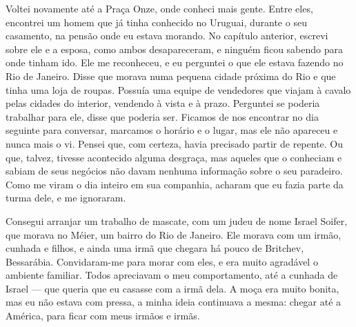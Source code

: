 
Voltei novamente até a Praça Onze, onde conheci mais gente. Entre
eles, encontrei um homem que já tinha conhecido no Uruguai, durante o seu
casamento, na pensão onde eu estava morando. No capítulo anterior, 
escrevi sobre ele e a esposa, como ambos desapareceram, e ninguém
ficou sabendo para onde tinham ido. Ele me reconheceu, e eu perguntei o
que ele estava fazendo no Rio de Janeiro. Disse que morava numa
pequena cidade próxima do Rio e que tinha uma loja de roupas. Possuía uma 
equipe de vendedores que viajam à cavalo pelas cidades do
interior, vendendo à vista e à prazo. Perguntei se poderia trabalhar para
ele, disse que poderia ser. Ficamos de nos encontrar no dia seguinte
para conversar, marcamos o horário e o lugar, mas ele não apareceu e
nunca mais o vi. Pensei que, com certeza, havia precisado partir de
repente. Ou que, talvez, tivesse acontecido alguma desgraça, mas
aqueles que o conheciam e sabiam de seus negócios não davam nenhuma
informação sobre o seu paradeiro. Como me viram o dia inteiro em sua
companhia, acharam que eu fazia parte da turma dele, e me ignoraram.


Consegui arranjar um trabalho de mascate, com um judeu de nome Israel
Soifer, que morava no Méier, um bairro do Rio de Janeiro. Ele morava
com um irmão, cunhada e filhos, e ainda uma irmã que chegara há pouco
de Britchev, Bessarábia. Convidaram-me para morar com eles, e era muito
agradável o ambiente familiar. Todos apreciavam o meu comportamento,
até a cunhada de Israel --- que queria que eu casasse com a irmã dela. A moça
era muito bonita, mas eu não estava com pressa, a minha ideia continuava
a mesma: chegar até a América, para ficar com meus irmãos e irmãs.

